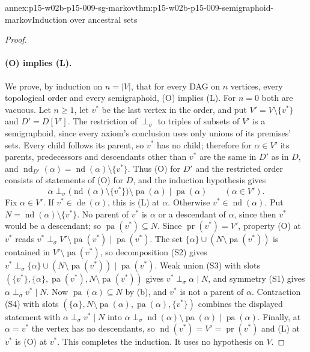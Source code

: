 \begin{annexitem}{annex:p15-w02b-p15-009-sg-markov}{thm:p15-w02b-p15-009-semigraphoid-markov}{Induction over ancestral sets}
\begin{proof}
\paragraph{(O) implies (L).}
We prove, by induction on \(n=|V|\), that for every DAG on \(n\)
vertices, every topological order and every semigraphoid, (O) implies
(L). For \(n=0\) both are vacuous. Let \(n\geq1\), let \(v^*\) be the
last vertex in the order, and put \(V'=V\setminus\{v^*\}\) and
\(D'=D[V']\). The restriction of \(\perp_\sigma\) to triples of subsets
of \(V'\) is a semigraphoid, since every axiom's conclusion uses only
unions of its premises' sets. Every child follows its parent, so
\(v^*\) has no child; therefore for \(\alpha\in V'\) its parents,
predecessors and descendants other than \(v^*\) are the same in \(D'\)
as in \(D\), and \(\operatorname{nd}_{D'}(\alpha)=
\operatorname{nd}(\alpha)\setminus\{v^*\}\). Thus (O) for \(D'\) and
the restricted order consists of statements of (O) for \(D\), and the
induction hypothesis gives
\[
 \alpha\perp_\sigma\bigl(\operatorname{nd}(\alpha)\setminus\{v^*\}\bigr)
   \setminus\operatorname{pa}(\alpha)\mid\operatorname{pa}(\alpha)
 \qquad(\alpha\in V').
\]
Fix \(\alpha\in V'\). If \(v^*\in\operatorname{de}(\alpha)\), this is
(L) at \(\alpha\). Otherwise \(v^*\in\operatorname{nd}(\alpha)\). Put
\(N=\operatorname{nd}(\alpha)\setminus\{v^*\}\). No parent of \(v^*\)
is \(\alpha\) or a descendant of \(\alpha\), since then \(v^*\) would be
a descendant; so \(\operatorname{pa}(v^*)\subseteq N\). Since
\(\operatorname{pr}(v^*)=V'\), property (O) at \(v^*\) reads
\(v^*\perp_\sigma V'\setminus\operatorname{pa}(v^*)\mid\operatorname{pa}(v^*)\).
The set \(\{\alpha\}\cup(N\setminus\operatorname{pa}(v^*))\) is contained
in \(V'\setminus\operatorname{pa}(v^*)\), so decomposition (S2) gives
\(v^*\perp_\sigma\{\alpha\}\cup(N\setminus\operatorname{pa}(v^*))\mid
\operatorname{pa}(v^*)\). Weak union (S3) with slots
\((\{v^*\},\{\alpha\},\operatorname{pa}(v^*),N\setminus\operatorname{pa}(v^*))\)
gives \(v^*\perp_\sigma\alpha\mid N\), and symmetry (S1) gives
\(\alpha\perp_\sigma v^*\mid N\). Now
\(\operatorname{pa}(\alpha)\subseteq N\) by (b), and \(v^*\) is not a
parent of \(\alpha\). Contraction (S4) with slots
\((\{\alpha\},N\setminus\operatorname{pa}(\alpha),\operatorname{pa}(\alpha),\{v^*\})\)
combines the displayed statement with \(\alpha\perp_\sigma v^*\mid N\)
into \(\alpha\perp_\sigma\operatorname{nd}(\alpha)\setminus\operatorname{pa}(\alpha)
\mid\operatorname{pa}(\alpha)\). Finally, at \(\alpha=v^*\) the vertex
has no descendants, so
\(\operatorname{nd}(v^*)=V'=\operatorname{pr}(v^*)\) and (L) at \(v^*\)
is (O) at \(v^*\). This completes the induction. It uses no hypothesis
on \(V\).


\end{proof}
\end{annexitem}
